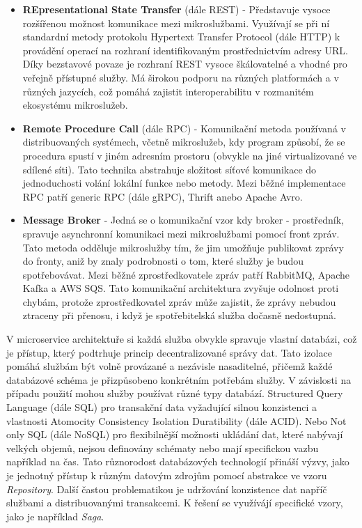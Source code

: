 \begin{itemize}
    \item \textbf{REpresentational State Transfer} (dále REST) - Představuje vysoce rozšířenou možnost komunikace mezi mikroslužbami. Využívají se při ní standardní metody protokolu Hypertext Transfer Protocol (dále HTTP) k provádění operací na rozhraní identifikovaným prostřednictvím adresy URL. Díky bezstavové povaze je rozhraní REST vysoce škálovatelné a vhodné pro veřejně přístupné služby. Má širokou podporu na různých platformách a v různých jazycích, což pomáhá zajistit interoperabilitu v rozmanitém ekosystému mikroslužeb.
    \item \textbf{Remote Procedure Call} (dále RPC) - Komunikační metoda používaná v distribuovaných systémech, včetně mikroslužeb, kdy program způsobí, že se procedura spustí v jiném adresním prostoru (obvykle na jiné virtualizované ve sdílené síti). Tato technika abstrahuje složitost síťové komunikace do jednoduchosti volání lokální funkce nebo metody. Mezi běžné implementace RPC patří generic RPC (dále gRPC), Thrift anebo Apache Avro.
    \item \textbf{Message Broker} - Jedná se o komunikační vzor kdy broker - prostředník, spravuje asynchronní komunikaci mezi mikroslužbami pomocí front zpráv. Tato metoda odděluje mikroslužby tím, že jim umožňuje publikovat zprávy do fronty, aniž by znaly podrobnosti o tom, které služby je budou spotřebovávat. Mezi běžné zprostředkovatele zpráv patří RabbitMQ, Apache Kafka a AWS SQS. Tato komunikační architektura zvyšuje odolnost proti chybám, protože zprostředkovatel zpráv může zajistit, že zprávy nebudou ztraceny při přenosu, i když je spotřebitelská služba dočasně nedostupná. 
\end{itemize}


V microservice architektuře si každá služba obvykle spravuje vlastní databázi, což je přístup, který podtrhuje princip decentralizované správy dat. Tato izolace pomáhá službám být volně provázané a nezávisle nasaditelné, přičemž každé databázové schéma je přizpůsobeno konkrétním potřebám služby. V závislosti na případu použití mohou služby používat různé typy databází. Structured Query Language (dále SQL) pro transakční data vyžadující silnou konzistenci a vlastnosti Atomocity Consistency Isolation Duratibility (dále ACID). Nebo Not only SQL (dále NoSQL) pro flexibilnější možnosti ukládání dat, které nabývají velkých objemů, nejsou definovány schématy nebo mají specifickou vazbu například na čas. Tato různorodost databázových technologií přináší výzvy, jako je jednotný přístup k různým datovým zdrojům pomocí abstrakce ve vzoru \emph{Repository}. Další častou problematikou je udržování konzistence dat napříč službami a distribuovanými transakcemi. K řešení se využívájí specifické vzory, jako je například \emph{Saga}.

